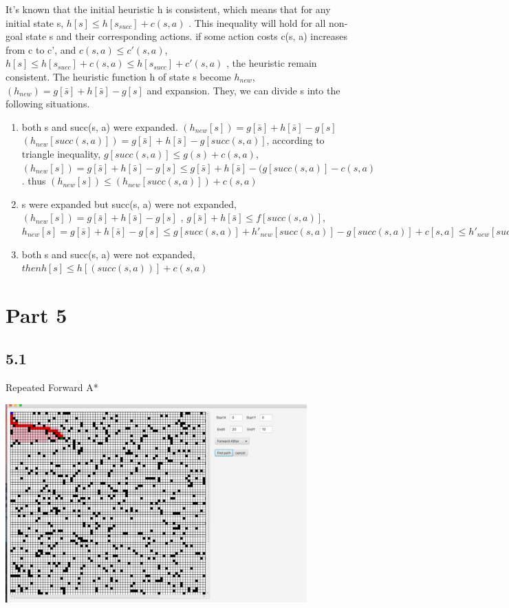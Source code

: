 \documentclass[12pt]{amsart}
\begin{document}
It's known that the initial heuristic h is consistent, which means that for any initial state s,  \(h[s] \leq h[s_{succ}] + c(s, a)\) . This inequality will hold for all non-goal state s and their corresponding actions. if some action costs c(s, a) increases from c to c', and $c(s, a) \leq c'(s, a)$,   \(h[s] \leq h[s_{succ}] + c(s, a) \leq h[s_{succ}] + c'(s, a)\) , the heuristic remain consistent. The heuristic function h of state s become $h_{new}$,  $(h_{new}) = g[\bar{s}] + h[\bar{s}]  - g[s]$ and expansion. They, we can divide s into the following situations.

\begin{enumerate}
\item both s and succ(s, a) were expanded.  $(h_{new}[s]) = g[\bar{s}] + h[\bar{s}]  - g[s]$ $(h_{new}[succ(s, a)]) = g[\bar{s}] + h[\bar{s}]  - g[succ(s, a)]$, according to triangle inequality,  $ g[succ(s, a)] \leq g(s) + c(s, a)$, 
$(h_{new}[s]) = g[\bar{s}] + h[\bar{s}] - g[s] \leq  g[\bar{s}] + h[\bar{s}] - (g[succ(s, a)] - c(s, a)$. thus $(h_{new}[s]) \leq (h_{new}[succ(s, a)]) + c(s, a)$
\item 
s were expanded but succ(s, a) were not expanded, $(h_{new}[s]) = g[\bar{s}] + h[\bar{s}]  - g[s]$ , $g[\bar{s}] + h[\bar{s}] \leq f[succ(s, a)]$,  $h_{new}[s] = g[\bar{s}] + h[\bar{s}]  - g[s] \leq g[succ(s, a)] + h'_{new}[succ(s, a)] -g[succ(s, a)] + c[s, a] \leq h'_{new}[succ(s, a)] +  c[s, a] $
\item 
both s and succ(s, a) were not expanded, $then h[s] \leq h[(succ(s, a))] + c(s, a)$
\end{enumerate}


\newpage
\section*{Part 5}
\subsection*{5.1}
Repeated Forward A*

\includegraphics[width=1\linewidth,height=3in]{forward_a_star.png}
\end{document}
